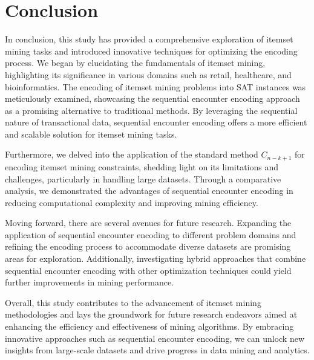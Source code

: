 \section{Conclusion}

In conclusion, this study has provided a comprehensive exploration of itemset mining tasks and introduced innovative techniques for optimizing the encoding process. We began by elucidating the fundamentals of itemset mining, highlighting its significance in various domains such as retail, healthcare, and bioinformatics. The encoding of itemset mining problems into SAT instances was meticulously examined, showcasing the sequential encounter encoding approach as a promising alternative to traditional methods. By leveraging the sequential nature of transactional data, sequential encounter encoding offers a more efficient and scalable solution for itemset mining tasks.

Furthermore, we delved into the application of the standard method $C_{n-k+1}$
for encoding itemset mining constraints, shedding light on its limitations and challenges, particularly in handling large datasets. Through a comparative analysis, we demonstrated the advantages of sequential encounter encoding in reducing computational complexity and improving mining efficiency.

Moving forward, there are several avenues for future research. Expanding the application of sequential encounter encoding to different problem domains and refining the encoding process to accommodate diverse datasets are promising areas for exploration. Additionally, investigating hybrid approaches that combine sequential encounter encoding with other optimization techniques could yield further improvements in mining performance.

Overall, this study contributes to the advancement of itemset mining methodologies and lays the groundwork for future research endeavors aimed at enhancing the efficiency and effectiveness of mining algorithms. By embracing innovative approaches such as sequential encounter encoding, we can unlock new insights from large-scale datasets and drive progress in data mining and analytics.